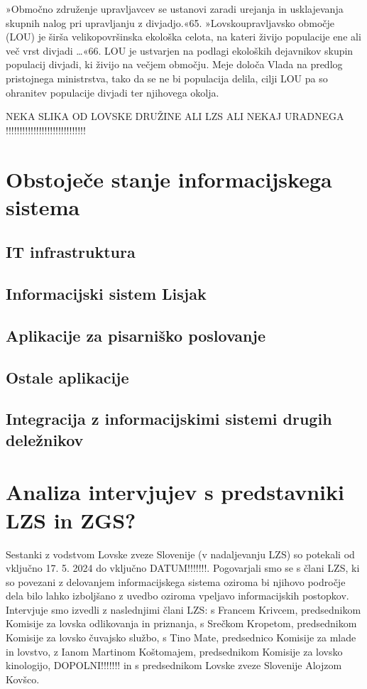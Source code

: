 \documentclass[a4paper,12pt,openright]{book}
\begin{document}
»Območno združenje upravljavcev se ustanovi zaradi urejanja in usklajevanja skupnih nalog pri upravljanju z divjadjo.«{65}.
»Lovskoupravljavsko območje (LOU) je širša velikopovršinska ekološka celota, na kateri živijo populacije ene ali več vrst divjadi …«{66}. 
LOU je ustvarjen na podlagi ekoloških dejavnikov skupin populacij divjadi, ki živijo na večjem območju. 
Meje določa Vlada na predlog pristojnega ministrstva, tako da se ne bi populacija delila, cilji LOU pa so ohranitev populacije divjadi ter njihovega okolja.

NEKA SLIKA OD LOVSKE DRUŽINE ALI LZS ALI NEKAJ URADNEGA !!!!!!!!!!!!!!!!!!!!!!!!!!!!!

\chapter{Obstoječe stanje informacijskega sistema}
\label{stanje}

\section{IT infrastruktura}

\section{Informacijski sistem Lisjak}

\section{Aplikacije za pisarniško poslovanje}

\section{Ostale aplikacije}

\section{Integracija z informacijskimi sistemi drugih deležnikov}

\chapter{Analiza intervjujev s predstavniki LZS in ZGS?}
\label{ch2}

Sestanki z vodstvom Lovske zveze Slovenije (v nadaljevanju LZS) so potekali od vključno 17. 5. 2024 do vključno DATUM!!!!!!!. 
Pogovarjali smo se s člani LZS, ki so povezani z delovanjem informacijskega sistema oziroma bi njihovo področje dela bilo lahko izboljšano z uvedbo oziroma vpeljavo informacijskih postopkov.
Intervjuje smo izvedli z naslednjimi člani LZS: s Francem Krivcem, predsednikom Komisije za lovska odlikovanja in priznanja, s Srečkom Kropetom, predsednikom Komisije za lovsko čuvajsko službo, s Tino Mate, predsednico Komisije za mlade in lovstvo, z Ianom Martinom Koštomajem, predsednikom Komisije za lovsko kinologijo, DOPOLNI!!!!!!! in s predsednikom Lovske zveze Slovenije Alojzom Kovšco. 
\end{document}

